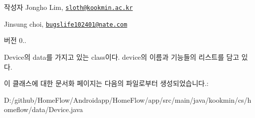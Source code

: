 \begin{DoxyAuthor}{작성자}
Jongho Lim, \href{mailto:sloth@kookmin.ac.kr}{\tt sloth@kookmin.\+ac.\+kr} 

Jinsung choi, \href{mailto:bugslife102401@nate.com}{\tt bugslife102401@nate.\+com} 
\end{DoxyAuthor}
\begin{DoxyVersion}{버전}
0..
\end{DoxyVersion}
Device의 data를 가지고 있는 class이다. device의 이름과 기능들의 리스트를 담고 있다. 

이 클래스에 대한 문서화 페이지는 다음의 파일로부터 생성되었습니다.\+:\begin{DoxyCompactItemize}
\item 
D\+:/github/\+Home\+Flow/\+Androidapp/\+Home\+Flow/app/src/main/java/kookmin/cs/homeflow/data/Device.\+java\end{DoxyCompactItemize}
